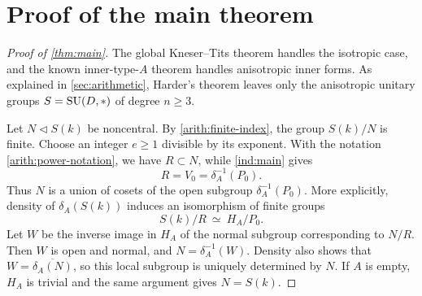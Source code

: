 \section{Proof of the main theorem}\label{sec:conclusion}

\begin{proof}[Proof of \cref{thm:main}]
The global Kneser--Tits theorem handles the isotropic case, and the known
inner-type-$A$ theorem handles anisotropic inner forms.  As explained in
\cref{sec:arithmetic}, Harder's theorem leaves only the anisotropic
unitary groups $S=\operatorname{SU}(D,*)$ of degree $n\geq3$.

Let $N\triangleleft S(k)$ be noncentral.  By
\cref{arith:finite-index}, the group $S(k)/N$ is finite.  Choose an integer
$e\geq1$ divisible by its exponent.  With the notation
\eqref{arith:power-notation}, we have $R\subset N$, while
\cref{ind:main} gives
\[
 R=V_0=\delta_A^{-1}(P_0).
\]
Thus $N$ is a union of cosets of the open subgroup
$\delta_A^{-1}(P_0)$.  More explicitly, density of $\delta_A(S(k))$
induces an isomorphism of finite groups
\[
 S(k)/R\ \simeq\ H_A/P_0.
\]
Let $W$ be the inverse image in $H_A$ of the normal subgroup corresponding
to $N/R$.  Then $W$ is open and normal, and
$N=\delta_A^{-1}(W)$.  Density also shows that
$W=\overline{\delta_A(N)}$, so this local subgroup is uniquely determined
by $N$.  If $A$ is empty, $H_A$ is trivial and the same argument gives
$N=S(k)$.
\end{proof}
